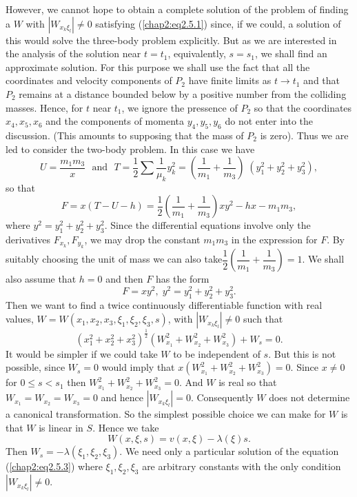 However, we cannot hope to obtain a complete solution of the problem of finding a $W$ with $|W_{x_k \xi_l}| \neq 0$ satisfying (\ref{chap2:eq2.5.1}) since, if we could, a solution of this would solve the three-body problem explicitly. But as we are interested in the analysis of the solution near $t = t_1$, equivalently, $s=s_1$, we shall find an approximate solution. For this purpose we shall use the fact that all the coordinates and velocity components of $P_2$ have finite limits as $t \to t_1$ and that $P_2$ remains at a distance bounded below by a positive number from the colliding masses. Hence, for $t$ near $t_1$, we ignore the pressence of $P_2$ so that the coordinates $x_4, x_5, x_6$ and the components of momenta $y_4, y_5, y_6$ do not enter into the discussion. (This amounts to supposing that the mass of $P_2$ is zero). Thus we are led to consider the two-body problem. In this case we have 
$$
U = \frac{m_1 m_3}{x} \text{~ and ~} T = \frac{1}{2} \sum \frac{1}{\mu_k} y^2_k = \left(\frac{1}{m_1} + \frac{1}{m_3} \right) \; (y^2_1 + y^2_2 +y^2_3),
$$
so that 
$$
F = x(T - U - h) = \frac{1}{2} \left(\frac{1}{m_1} + \frac{1}{m_3} \right) xy^2 - hx - m_1 m_3,
$$
where $y^2 = y^2_1 + y^2_2+ y^2_3$. Since the differential equations involve only the derivatives $F_{x_k}, F_{y_k}$, we may drop the constant $m_1 m_3$ in the expression for $F$. By suitably choosing the unit of mass we can also take\pageoriginale $\dfrac{1}{2} \left(\dfrac{1}{m_1} + \dfrac{1}{m_3} \right) =1$. We shall also assume that $h=0$ and then $F$ has the form 
\begin{equation*}
F = xy^2, \; y^2 = y^2_1 + y^2_2 + y^2_3. \tag{2.5.2}\label{chap2:eq2.5.2} 
\end{equation*}
Then we want to find a twice continuously differentiable function with real values, $W = W(x_1, x_2, x_3, \xi_1,\xi_2, \xi_3, s)$, with $|W_{x_k \xi_l}| \neq 0$ such that 
\begin{equation*}
(x^2_1 + x^2_2 + x^2_3)^{\frac{1}{2}} (W^2_{x_1} + W^2_{x_2} + W^2_{x_3}) + W_s = 0. \tag{2.5.3}\label{chap2:eq2.5.3} 
\end{equation*}
It would be simpler if we could take $W$ to be independent of $s$. But this is not possible, since $W_s = 0$ would imply that $x(W^2_{x_1} + W^2_{x_2} + W^2_{x_3}) = 0$. Since $x \neq 0$ for $0 \leq s < s_1$ then $W^2_{x_1} + W^2_{x_2}+ W^2_{x_3} = 0$. And $W$ is real so that $W_{x_1} = W_{x_2} = W_{x_3} = 0$ and hence $|W_{x_k \xi_l}| = 0$. Consequently $W$ does not determine a canonical transformation. So the simplest possible choice we can make for $W$ is that $W$ is linear in $S$. Hence we take
\begin{equation*}
W(x, \xi, s) = v(x, \xi) - \lambda (\xi) s. \tag{2.5.4}\label{chap2:eq2.5.4} 
\end{equation*}
Then $W_s = - \lambda (\xi_1, \xi_2, \xi_3)$. We need only a particular solution of the equation (\ref{chap2:eq2.5.3}) where $\xi_1, \xi_2, \xi_3$ are arbitrary constants with the only condition $|W_{x_k \xi_l}| \neq 0$.

